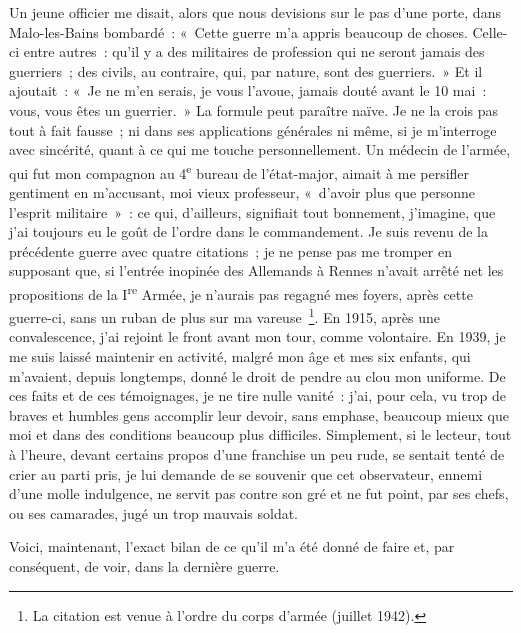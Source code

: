 \documentclass[french,twoside]{book} %
\begin{document}
Un jeune officier me disait, alors que nous devisions sur le pas d’une porte, dans Malo-les-Bains bombardé : « Cette guerre m’a appris beaucoup de choses. Celle-ci entre autres : qu’il y a des militaires de profession qui ne seront jamais des guerriers ;   des civils, au contraire, qui, par nature, sont des guerriers. » Et il ajoutait : « Je ne m’en serais, je vous l’avoue, jamais douté avant le 10 mai : vous, vous êtes un guerrier. » La formule peut paraître naïve. Je ne la crois pas tout à fait fausse ; ni dans ses applications générales ni même, si je m’interroge avec sincérité, quant à ce qui me touche personnellement. Un médecin de l’armée, qui fut mon compagnon au 4\textsuperscript{e} bureau de l’état-major, aimait à me persifler gentiment en m’accusant, moi vieux professeur, « d’avoir plus que personne l’esprit militaire » : ce qui, d’ailleurs, signifiait tout bonnement, j’imagine, que j’ai toujours eu le goût de l’ordre dans le commandement. Je suis revenu de la précédente guerre avec quatre citations ; je ne pense pas me tromper en supposant que, si l’entrée inopinée des Allemands à Rennes n’avait arrêté net les propositions de la I\textsuperscript{re} Armée, je n’aurais pas regagné mes foyers, après cette guerre-ci, sans un ruban de plus sur ma vareuse \footnote{La citation est venue à l’ordre du corps d’armée (juillet 1942).}. En 1915, après une convalescence, j’ai rejoint le front avant mon tour, comme volontaire. En 1939, je me suis laissé maintenir en activité, malgré mon âge et mes six enfants, qui m’avaient, depuis longtemps, donné le droit de pendre au clou mon uniforme. De ces faits et de ces témoignages, je ne tire nulle vanité : j’ai, pour cela, vu trop de braves et humbles gens accomplir leur devoir, sans emphase, beaucoup mieux que moi et dans des conditions beaucoup plus difficiles. Simplement, si le lecteur, tout à l’heure, devant certains propos d’une franchise un peu rude, se sentait tenté de crier au parti pris, je lui demande de se souvenir que cet observateur, ennemi d’une molle indulgence, ne servit pas contre son gré et ne fut point, par ses chefs, ou ses camarades, jugé un trop mauvais soldat.\par
  Voici, maintenant, l’exact bilan de ce qu’il m’a été donné de faire et, par conséquent, de voir, dans la dernière guerre.\par
\end{document}
